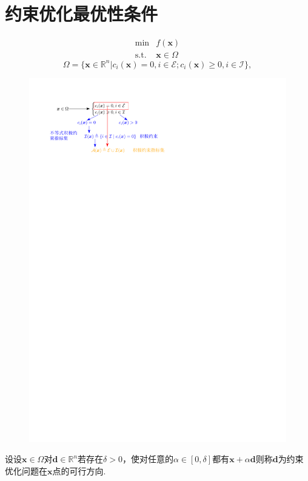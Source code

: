 \section{约束优化最优性条件}
\[
    \begin{array}{ll}
        \min & f(\boldsymbol{x})\\
        \mathrm{s.t.} & \boldsymbol{x}\in\Omega
    \end{array}
\]
\[
    \Omega=\{\boldsymbol{x}\in\mathbb{R}^{n}|c_{i}(\boldsymbol{x})=0,i\in\mathcal{E};c_{i}(\boldsymbol{x})\geqslant 0, i\in\mathcal{I}\},
\]
\begin{figure}[htbp]
    \centering
    \includegraphics{image/积极约束指标集.pdf}
\end{figure}
\begin{definition}[可行方向]
    设设$\boldsymbol{x}\in \Omega$对$\boldsymbol{d}\in\mathbb{R}^{n}$若存在$\delta>0$，使对任意的$\alpha\in[0,\delta]$都有$\boldsymbol{x}+\alpha\boldsymbol{d}$则称$\boldsymbol{d}$为约束优化问题在$\boldsymbol{x}$点的可行方向.
\end{definition}
